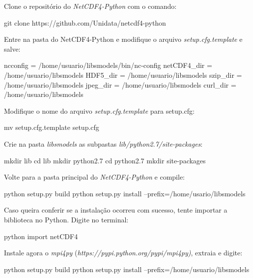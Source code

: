 \noindent Clone o repositório do \textit{NetCDF4-Python} com o comando:
\bigskip

\begin{bashcode}
git clone https://github.com/Unidata/netcdf4-python
\end{bashcode}
\bigskip

\noindent Entre na pasta do NetCDF4-Python e modifique o arquivo \textit{setup.cfg.template} e salve:
\bigskip

\begin{bashcode}
ncconfig    = /home/usuario/libsmodels/bin/nc-config
netCDF4_dir = /home/usuario/libsmodels
HDF5_dir    = /home/usuario/libsmodels
szip_dir    = /home/usuario/libsmodels
jpeg_dir    = /home/usuario/libsmodels
curl_dir    = /home/usuario/libsmodels
\end{bashcode}
\bigskip

\noindent Modifique o nome do arquivo \textit{setup.cfg.template} para setup.cfg:
\bigskip

\begin{bashcode}
mv setup.cfg.template setup.cfg
\end{bashcode}
\bigskip

\noindent Crie na pasta \textit{libsmodels} as subpastas \textit{lib/python2.7/site-packages}:
\bigskip

\begin{bashcode}
mkdir lib
cd lib
mkdir python2.7
cd python2.7
mkdir site-packages
\end{bashcode}
\bigskip

\noindent Volte para a pasta principal do \textit{NetCDF4-Python} e compile:
\bigskip

\begin{bashcode}
python setup.py build
python setup.py install --prefix=/home/usario/libsmodels
\end{bashcode}
\bigskip

\noindent Caso queira conferir se a instalação ocorreu com sucesso, tente importar a biblioteca no Python. Digite no terminal:
\bigskip

\begin{bashcode}
python
import netCDF4
\end{bashcode}
\bigskip

\noindent Instale agora o \textit{mpi4py} (\textcolor{bleu_cite}{\textit{https://pypi.python.org/pypi/mpi4py)}}, extraia e digite:
\bigskip

\begin{bashcode}
python setup.py build
python setup.py install --prefix=/home/usuario/libsmodels
\end{bashcode}
\bigskip

